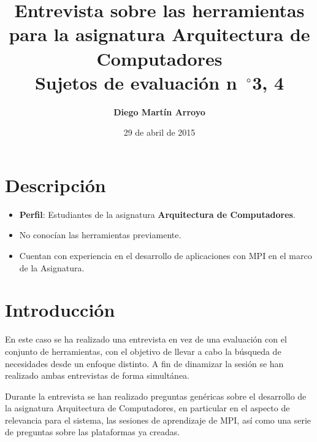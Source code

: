 

\newcommand{\hmwkTitle}{Entrevista sobre las herramientas para la asignatura Arquitectura de Computadores} %
\newcommand{\hmwkDueDate}{Miércoles,\ 29\ de\ April\ de\ 2015}
\newcommand{\hmwkClassInstructor}{Rodrigo Santamaría} %
\newcommand{\hmwkAuthorName}{Diego Martín Arroyo} %
\newcommand{\hmwkSubject}{3, 4} %

\newcommand{\ordinalindicator}{\hspace{-1.5mm}$\phantom{a}^{\circ}$}
\title{\hmwkTitle\\Sujetos de evaluación n\ordinalindicator \hmwkSubject}
\author{\textbf{\hmwkAuthorName}}
\date{29 de abril de 2015} %


\maketitle

\tableofcontents
\section{Descripción}

\begin{itemize}
	\item \textbf{Perfil}: Estudiantes de la asignatura \textbf{Arquitectura de Computadores}.
	\item No conocían las herramientas previamente.
	\item Cuentan con experiencia en el desarrollo de aplicaciones con MPI en el marco de la Asignatura.
\end{itemize}


\section{Introducción}

En este caso se ha realizado una entrevista en vez de una evaluación con el conjunto de herramientas, con el objetivo de llevar a cabo la búsqueda de necesidades desde un enfoque distinto. A fin de dinamizar la sesión se han realizado ambas entrevistas de forma simultánea.

Durante la entrevista se han realizado preguntas genéricas sobre el desarrollo de la asignatura Arquitectura de Computadores, en particular en el aspecto de relevancia para el sistema, las sesiones de aprendizaje de MPI, así como una serie de preguntas sobre las plataformas ya creadas.

